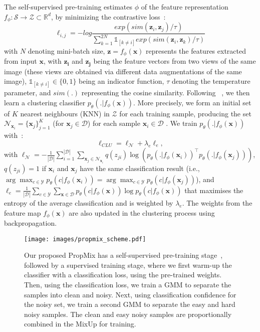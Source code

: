 \documentclass{bmvc2k}
\begin{document}
The self-supervised pre-training estimates $\phi$ of the feature representation $f_{\phi}:\mathcal{S} \to \mathcal{Z} \subset \mathbb{R}^d$, by minimizing the contrastive loss~\citep{SimCLR,MoCo,MoCoV2}:
\begin{equation}
\ell_{i,j}= -log\frac{exp(sim(\mathbf{z}_i, \mathbf{z}_j)/\tau)}{\sum_{k=1}^{2N} \mathds{1}_{[k\neq i]} exp(sim(\mathbf{z}_i, \mathbf{z}_k)/\tau) }
\end{equation}
with $N$ denoting mini-batch size, 
$\mathbf{z}=f_{\phi}(\mathbf{x})$
represents the features extracted from input $\mathbf{x}$, with $\mathbf{z_i}$ and  $\mathbf{z_j}$ being the feature vectors from two views of the same image (these views are obtained via different data augmentations of the same image),
$\mathds{1}_{[k\neq i]}\in\{0,1\}$ being an indicator function, $\tau$ denoting the temperature parameter, and $sim(.)$ representing the cosine similarity.
Following ~\citep{SCAN}, we then learn a clustering classifier $p_{\theta}(.|f_{\phi}(\mathbf{x}))$. More precisely, we form an initial set of $K$ nearest neighbours (KNN) in $\mathcal{Z}$ for each training sample, producing the set $\mathcal{N}_{\mathbf{x}_{i}} = \{ \mathbf{x}_j \}_{j=1}^K$ (for $\mathbf{x}_j \in \mathcal{D}$) for each sample $\mathbf{x}_i \in \mathcal{D}$ . We train $p_{\theta}(.|f_{\phi}(\mathbf{x}))$ with~\citep{SCAN}:
\begin{equation}
    \ell_{CLU}= \ell_{\mathcal{N}} +
    \lambda_e\ell_{e},
    \label{eq:cluster_loss}
\end{equation}
with 
$\ell_{\mathcal{N}} = -\frac{1}{|\mathcal{D}|} \sum_{i=1}^{|\mathcal{D}|} \sum_{\mathbf{x}_j \in \mathcal{N}_{\mathbf{x}_{i}}} q(z_{ji}) \log \left ( p_{\theta}(.|f_{\phi}(\mathbf{x}_i))^{\top}p_{\theta}(.|f_{\phi}(\mathbf{x}_j)) \right )$,
$q(z_{ji}) = 1$ if $\mathbf{x}_i$ and $\mathbf{x}_j$ have the same classification result (i.e.,
$\arg\max_{c \in \mathcal{Y}}p_{\theta}(c | f_{\phi}(\mathbf{x}_i))=\arg\max_{c \in \mathcal{Y}}p_{\theta}(c | f_{\phi}(\mathbf{x}_j))$),
and 
$\ell_e=\frac{1}{|\mathcal{D}|}
\sum_{c \in \mathcal{Y}}\sum_{\mathbf{x} \in \mathcal{D}}p_{\theta}(c|f_{\phi}(\mathbf{x})) \log p_{\theta}(c|f_{\phi}(\mathbf{x}))$
that maximises the entropy of the average classification and is weighted by $\lambda_e$. 
The weights from the feature map $f_{\phi}(\mathbf{x})$ are also updated in the clustering process using backpropagation.


\begin{figure}[!t]
\centering
\texttt{[image: images/propmix\_scheme.pdf]}
\caption{Our proposed PropMix has a self-supervised pre-training stage~\citep{SimCLR,MoCo,MoCoV2,SCAN}, followed by a supervised training stage, where we first warm-up the classifier with a classification loss, using the pre-trained weights. Then, using the classification loss, we train a GMM to separate the samples into clean and noisy. Next, using classification confidence for the noisy set, we train a second GMM to separate the easy and hard noisy samples. The clean and easy noisy samples are proportionally combined in the MixUp for training.  }
\label{fig:propmix}
\end{figure}
 
\end{document}
